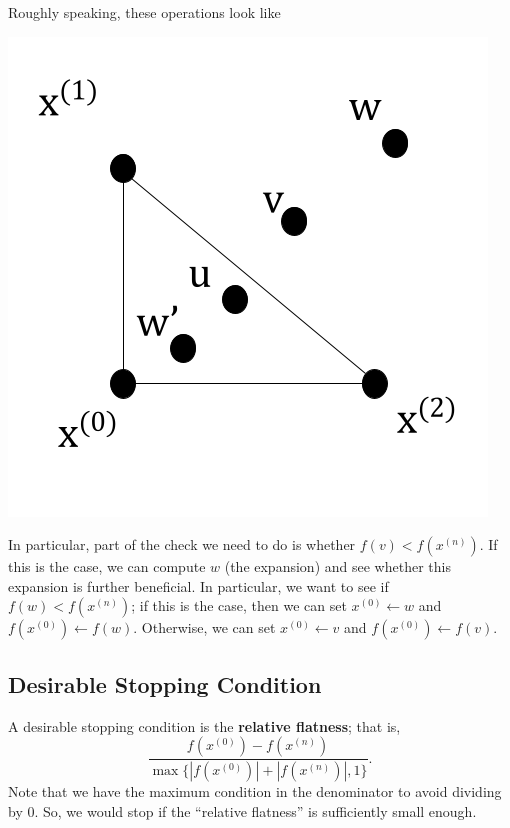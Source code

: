 \documentclass[letterpaper]{article}
\begin{document}
Roughly speaking, these operations look like 
\begin{center}
    \includegraphics[scale=0.35]{../assets/triangle_simplex4.png}
\end{center}
In particular, part of the check we need to do is whether $f(v) < f(x^{(n)})$. If this is the case, we can compute $w$ (the expansion) and see whether this expansion is further beneficial. In particular, we want to see if $f(w) < f(x^{(n)})$; if this is the case, then we can set $x^{(0)} \gets w$ and $f(x^{(0)}) \gets f(w)$. Otherwise, we can set $x^{(0)} \gets v$ and $f(x^{(0)}) \gets f(v)$. 


\subsection{Desirable Stopping Condition}
A desirable stopping condition is the \textbf{relative flatness}; that is, 
\[\frac{f(x^{(0)}) - f(x^{(n)})}{\max\{|f(x^{(0)})| + |f(x^{(n)})|, 1\}}.\]
Note that we have the maximum condition in the denominator to avoid dividing by 0. So, we would stop if the ``relative flatness'' is sufficiently small enough.
\end{document}
